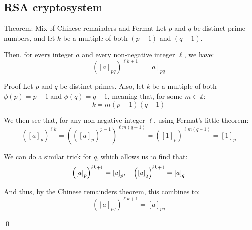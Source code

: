 \documentclass[a4paper]{article}
\begin{document}
\subsection{RSA cryptosystem}
\begin{parag}{Theorem: Mix of Chinese remainders and Fermat}
    Let $p$ and $q$ be distinct prime numbers, and let $k$ be a multiple of both $\left(p - 1\right)$ and $\left(q - 1\right)$.

    Then, for every integer $a$ and every non-negative integer $\ell$, we have:
    \[\left(\left[a\right]_{pq}\right)^{\ell k + 1} = \left[a\right]_{pq}\]

    \begin{subparag}{Proof}
        Let $p$ and $q$ be distinct primes. Also, let $k$ be a multiple of both $\phi\left(p\right) = p - 1$ and $\phi\left(q\right) = q - 1$, meaning that, for some $m \in \mathbb{Z}$:
        \[k = m\left(p-1\right)\left(q-1\right)\]

        We then see that, for any non-negative integer $\ell$, using Fermat's little theorem:
        \[\left(\left[a\right]_p\right)^{\ell k} = \left(\left(\left[a\right]_p\right)^{p - 1}\right)^{\ell m\left(q - 1\right)} = \left(\left[1\right]_p\right)^{\ell m\left(q - 1\right)} = \left[1\right]_p\]

        We can do a similar trick for $q$, which allows us to find that:
        \[\left(\left[a\right]_p\right)^{\ell k + 1} = \left[a\right]_p, \mathspace \left(\left[a\right]_q\right)^{\ell k + 1} = \left[a\right]_q\]

        And thus, by the Chinese remainders theorem, this combines to:
        \[\left(\left[a\right]_{pq}\right)^{\ell k + 1} = \left[a\right]_{pq}\]

        \qed
    \end{subparag}
\end{parag}
\end{document}
